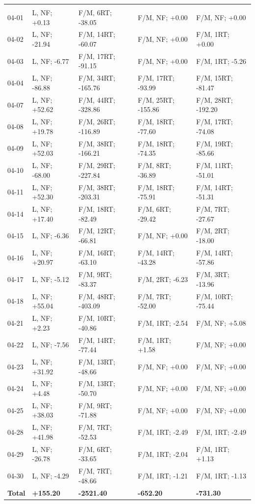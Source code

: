 \begin{table}[H]
\begin{tabular*}{\textwidth}{@{\extracolsep{\fill}} lllll}
\addlinespace[0.25em]
\midrule
\multicolumn{5}{@{}l}{\textbf{April 2025}}\\
04-01 & L, NF; +0.13 & F/M, 6RT; -38.05 & F/M, NF; +0.00 & F/M, NF; +0.00 \\
04-02 & L, NF; -21.94 & F/M, 14RT; -60.07 & F/M, NF; +0.00 & F/M, 1RT; +0.00 \\
04-03 & L, NF; -6.77 & F/M, 17RT; -91.15 & F/M, NF; +0.00 & F/M, 1RT; -5.26 \\
04-04 & L, NF; -86.88 & F/M, 34RT; -165.76 & F/M, 17RT; -93.99 & F/M, 15RT; -81.47 \\
04-07 & L, NF; +52.62 & F/M, 44RT; -328.86 & F/M, 25RT; -155.86 & F/M, 28RT; -192.20 \\
04-08 & L, NF; +19.78 & F/M, 26RT; -116.89 & F/M, 18RT; -77.60 & F/M, 17RT; -74.08 \\
04-09 & L, NF; +52.03 & F/M, 38RT; -166.21 & F/M, 18RT; -74.35 & F/M, 19RT; -85.66 \\
04-10 & L, NF; -68.00 & F/M, 29RT; -227.84 & F/M, 8RT; -36.89 & F/M, 11RT; -51.01 \\
04-11 & L, NF; +52.30 & F/M, 38RT; -203.31 & F/M, 18RT; -75.91 & F/M, 14RT; -51.31 \\
04-14 & L, NF; +17.40 & F/M, 18RT; -82.49 & F/M, 6RT; -29.42 & F/M, 7RT; -27.67 \\
04-15 & L, NF; -6.36 & F/M, 12RT; -66.81 & F/M, NF; +0.00 & F/M, 2RT; -18.00 \\
04-16 & L, NF; +20.97 & F/M, 16RT; -63.10 & F/M, 14RT; -43.28 & F/M, 14RT; -57.86 \\
04-17 & L, NF; -5.12 & F/M, 9RT; -83.37 & F/M, 2RT; -6.23 & F/M, 3RT; -13.96 \\
04-18 & L, NF; +55.04 & F/M, 48RT; -403.09 & F/M, 7RT; -52.00 & F/M, 10RT; -75.44 \\
04-21 & L, NF; +2.23 & F/M, 10RT; -40.86 & F/M, 1RT; -2.54 & F/M, NF; +5.08 \\
04-22 & L, NF; -7.56 & F/M, 14RT; -77.44 & F/M, 1RT; +1.58 & F/M, NF; +0.00 \\
04-23 & L, NF; +31.92 & F/M, 13RT; -48.66 & F/M, NF; +0.00 & F/M, NF; +0.00 \\
04-24 & L, NF; +4.48 & F/M, 13RT; -50.70 & F/M, NF; +0.00 & F/M, NF; +0.00 \\
04-25 & L, NF; +38.03 & F/M, 9RT; -71.88 & F/M, NF; +0.00 & F/M, NF; +0.00 \\
04-28 & L, NF; +41.98 & F/M, 7RT; -52.53 & F/M, 1RT; -2.49 & F/M, 1RT; -2.49 \\
04-29 & L, NF; -26.78 & F/M, 6RT; -33.65 & F/M, 1RT; -2.04 & F/M, 1RT; +1.13 \\
04-30 & L, NF; -4.29 & F/M, 7RT; -48.66 & F/M, 1RT; -1.21 & F/M, 1RT; -1.13 \\
\textbf{Total} & \textbf{+155.20} & \textbf{-2521.40} & \textbf{-652.20} & \textbf{-731.30} \\


\end{tabular*}
\end{table}
